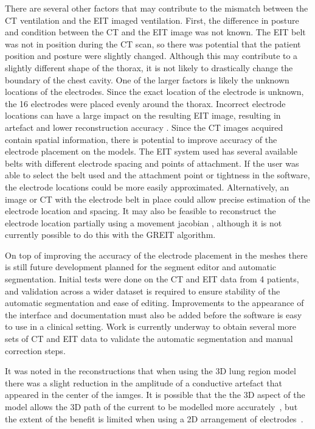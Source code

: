 There are several other factors that may contribute to the mismatch between the 
CT ventilation and the EIT imaged ventilation. 
First, the difference in posture and condition between the CT and the EIT image 
was not known. The EIT belt was not in position during the CT scan, so  there was potential that the
patient position and posture were slightly changed. Although this may contribute to a slightly different
shape of the thorax, it is not likely to drastically change the boundary of the chest cavity. 
One of the larger factors is likely the unknown locations of the electrodes. Since the exact location 
of the electrode is unknown, the 16 electrodes were placed evenly around the thorax. 
Incorrect electrode locations can have a large impact on the resulting EIT
image, resulting in artefact and lower reconstruction accuracy \parencite{boyle_impact_2011}.
Since the CT images acquired 
contain spatial information, there is potential to improve accuracy of the 
electrode placement on the models. The EIT system used has several available belts with 
different electrode spacing and points of attachment. If the user was able to select 
the belt used and the attachment point or tightness in the software, 
the electrode locations could be more easily 
approximated. Alternatively, an image or CT with the electrode belt in place could allow
precise estimation of the electrode location and spacing. It may also 
be feasible to reconstruct the electrode location partially using a movement jacobian 
\parencite{soleimani_imaging_2006}, although it is not currently possible to do this 
with the GREIT algorithm. 

On top of improving the accuracy of the electrode placement in the meshes there is still future development 
planned for the segment editor and automatic segmentation. Initial tests were done on the CT and EIT data
from 4 patients, and validation across a wider dataset is required to ensure stability 
of the automatic segmentation and ease of editing. Improvements to the appearance of the interface and 
documentation must also be added before the software is easy to use in a clinical setting. 
Work is currently underway to obtain several more sets of CT and EIT data to validate the automatic 
segmentation and manual correction steps. 

It was noted in the reconstructions that when using the 3D lung region model there was a
slight reduction in the amplitude of a conductive artefact that appeared in the center of
the iamges. It is possible that the the 3D aspect of the model allows the 3D path of the current
to be modelled more accurately~\parencite{adler_electrical_2017}, but the 
extent of the benefit is limited when using a 2D arrangement of 
electrodes~\parencite{grychtol_3d_2016}.

